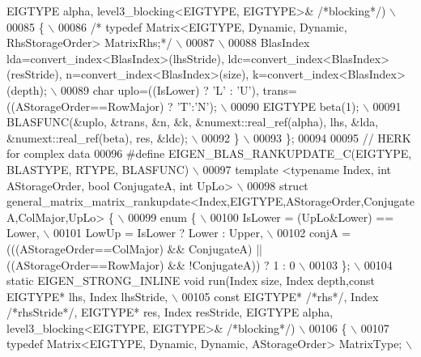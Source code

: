 \begin{DoxyCode}
{       EIGTYPE alpha, level3\_blocking<EIGTYPE, EIGTYPE>& }\textcolor{comment}{/*blocking*/}\textcolor{preprocessor}{) \(\backslash\)}
00085 \textcolor{preprocessor}{  \{ \(\backslash\)}
00086 \textcolor{preprocessor}{  }\textcolor{comment}{/* typedef Matrix<EIGTYPE, Dynamic, Dynamic, RhsStorageOrder> MatrixRhs;*/}\textcolor{preprocessor}{ \(\backslash\)}
00087 \textcolor{preprocessor}{\(\backslash\)}
00088 \textcolor{preprocessor}{   BlasIndex lda=convert\_index<BlasIndex>(lhsStride), ldc=convert\_index<BlasIndex>(resStride),
       n=convert\_index<BlasIndex>(size), k=convert\_index<BlasIndex>(depth); \(\backslash\)}
00089 \textcolor{preprocessor}{   char uplo=((IsLower) ? 'L' : 'U'), trans=((AStorageOrder==RowMajor) ? 'T':'N'); \(\backslash\)}
00090 \textcolor{preprocessor}{   EIGTYPE beta(1); \(\backslash\)}
00091 \textcolor{preprocessor}{   BLASFUNC(&uplo, &trans, &n, &k, &numext::real\_ref(alpha), lhs, &lda, &numext::real\_ref(beta), res,
       &ldc); \(\backslash\)}
00092 \textcolor{preprocessor}{  \} \(\backslash\)}
00093 \textcolor{preprocessor}{\};}
00094 
00095 \textcolor{comment}{// HERK for complex data}
00096 \textcolor{preprocessor}{#define EIGEN\_BLAS\_RANKUPDATE\_C(EIGTYPE, BLASTYPE, RTYPE, BLASFUNC) \(\backslash\)}
00097 \textcolor{preprocessor}{template <typename Index, int AStorageOrder, bool ConjugateA, int  UpLo> \(\backslash\)}
00098 \textcolor{preprocessor}{struct general\_matrix\_matrix\_rankupdate<Index,EIGTYPE,AStorageOrder,ConjugateA,ColMajor,UpLo> \{ \(\backslash\)}
00099 \textcolor{preprocessor}{  enum \{ \(\backslash\)}
00100 \textcolor{preprocessor}{    IsLower = (UpLo&Lower) == Lower, \(\backslash\)}
00101 \textcolor{preprocessor}{    LowUp = IsLower ? Lower : Upper, \(\backslash\)}
00102 \textcolor{preprocessor}{    conjA = (((AStorageOrder==ColMajor) && ConjugateA) || ((AStorageOrder==RowMajor) && !ConjugateA)) ? 1 :
       0 \(\backslash\)}
00103 \textcolor{preprocessor}{  \}; \(\backslash\)}
00104 \textcolor{preprocessor}{  static EIGEN\_STRONG\_INLINE void run(Index size, Index depth,const EIGTYPE* lhs, Index lhsStride, \(\backslash\)}
00105 \textcolor{preprocessor}{                          const EIGTYPE* }\textcolor{comment}{/*rhs*/}\textcolor{preprocessor}{, Index }\textcolor{comment}{/*rhsStride*/}\textcolor{preprocessor}{, EIGTYPE* res, Index resStride,
       EIGTYPE alpha, level3\_blocking<EIGTYPE, EIGTYPE>& }\textcolor{comment}{/*blocking*/}\textcolor{preprocessor}{) \(\backslash\)}
00106 \textcolor{preprocessor}{  \{ \(\backslash\)}
00107 \textcolor{preprocessor}{   typedef Matrix<EIGTYPE, Dynamic, Dynamic, AStorageOrder> MatrixType; \(\backslash\)}

\end{DoxyCode}

